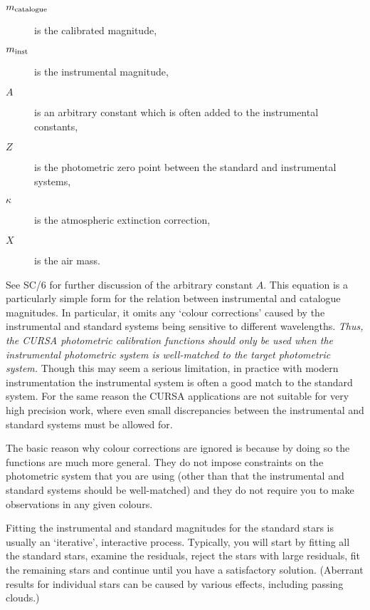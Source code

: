 \documentclass[twoside,11pt]{article}
\newcommand{\xref}[3]{#1}
\renewcommand{\_}{\texttt{\symbol{95}}}
\begin{document}
\begin{description}

  \item[$m_{\rm catalogue}$] is the calibrated magnitude,

  \item[$m_{\rm inst}$] is the instrumental magnitude,

  \item[$A$] is an arbitrary constant which is often added to the
   instrumental constants,

  \item[$Z$] is the photometric zero point between the standard and
   instrumental systems,

  \item[$\kappa$] is the atmospheric extinction correction,

  \item[$X$] is the air mass.

\end{description}

See \xref{SC/6}{sc6}{} for further discussion of the arbitrary constant
$A$.  This equation is a particularly simple form for the relation
between instrumental and catalogue magnitudes.  In particular, it omits
any `colour corrections' caused by the instrumental and standard
systems being sensitive to different wavelengths.  {\it Thus, the
CURSA photometric calibration functions should only be used when the
instrumental photometric system is well-matched to the target
photometric system.}  Though this may seem a serious limitation,
in practice with modern instrumentation the instrumental system is often
a good match to the standard system.  For the same reason the CURSA
applications are not suitable for very high precision work, where even
small discrepancies between the instrumental and standard systems
must be allowed for.

The basic reason why colour corrections are ignored is because by doing
so the functions are much more general.  They do not impose constraints
on the photometric system that you are using (other than that the
instrumental and standard systems should be well-matched) and they do
not require you to make observations in any given colours.

Fitting the instrumental and standard magnitudes for the standard stars
is usually an `iterative', interactive process.  Typically, you will
start by fitting all the standard stars, examine the residuals,
reject the stars with large residuals, fit the remaining stars and
continue until you have a satisfactory solution.  (Aberrant results
for individual stars can be caused by various effects, including
passing clouds.)
\end{document}
